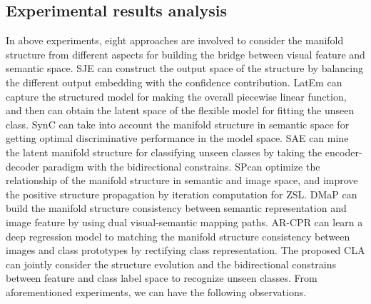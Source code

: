 \documentclass[review]{elsarticle}
\begin{document}
\subsection{Experimental results analysis}
\label{analysis}
In above experiments, eight approaches are involved to consider the manifold structure from different aspects for building the bridge between visual feature and semantic space. SJE\cite{7298911} can construct the output space of the structure by balancing the different output embedding with the confidence contribution. LatEm\cite{7780384} can capture the structured model for making the overall piecewise linear function, and then can obtain the latent space of the flexible model for fitting the unseen class. SynC\cite{Changpinyo2016} can take into account the manifold structure in semantic space for getting optimal discriminative performance in the model space. SAE\cite{Kodirov2017} can mine the latent manifold structure for classifying unseen classes by taking the encoder-decoder paradigm with the bidirectional constrains. SP\cite{Lin2018structure}can optimize the relationship of the manifold structure in semantic and image space, and improve the positive structure propagation by iteration computation for ZSL. DMaP\cite{Li2017Paths} can build the manifold structure consistency between semantic representation and image feature by using dual visual-semantic mapping paths. AR-CPR\cite{8016672} can learn a deep regression model to matching the manifold structure consistency between images and class prototypes by rectifying class representation. The proposed CLA can jointly consider the structure evolution and the bidirectional constrains between feature and class label space to recognize unseen classes. From aforementioned experiments, we can have the following observations.
\end{document}
